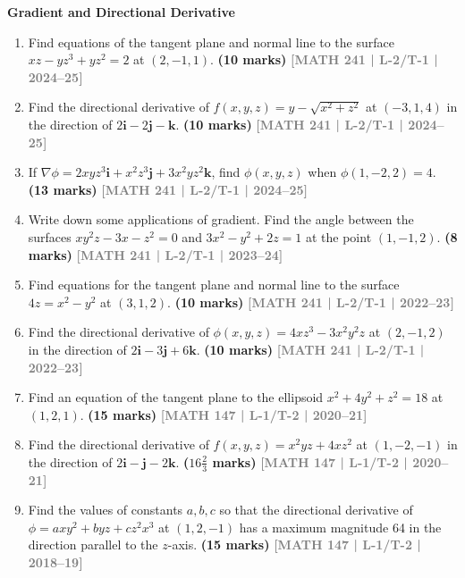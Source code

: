 \documentclass[12pt,a4paper]{article}
\newcommand{\yr}[1]{\hfill\textcolor{gray}{\small\textbf{[#1]}}}
\newcommand{\mk}[1]{\textcolor{orange!70!black}{\small\textbf{(#1 marks)}}}
\newcommand{\subtopic}[2]{%
  \vspace{10pt}
  \noindent\begin{tcolorbox}[colback=#1!8,colframe=#1,boxrule=0.6pt,arc=4pt,
    left=6pt,right=6pt,top=4pt,bottom=4pt]
    \small\bfseries\textcolor{#1}{#2}
  \end{tcolorbox}
  \vspace{2pt}
}
\begin{document}
\subtopic{cD}{Gradient and Directional Derivative}
\label{sub:s4-gradient}

\begin{enumerate}\item Find equations of the tangent plane and normal line to the surface $xz-yz^{3}+yz^{2}=2$ at $(2,-1,1)$.
\mk{10} \yr{MATH 241 | L-2/T-1 | 2024--25}

\item Find the directional derivative of $f(x,y,z)=y-\sqrt{x^{2}+z^{2}}$ at $(-3,1,4)$ in the direction of $2\mathbf{i}-2\mathbf{j}-\mathbf{k}$.
\mk{10} \yr{MATH 241 | L-2/T-1 | 2024--25}

\item If $\nabla\phi=2xyz^{3}\mathbf{i}+x^{2}z^{3}\mathbf{j}+3x^{2}yz^{2}\mathbf{k}$, find $\phi(x,y,z)$ when $\phi(1,-2,2)=4$.
\mk{13} \yr{MATH 241 | L-2/T-1 | 2024--25}

\item Write down some applications of gradient. Find the angle between the surfaces $xy^{2}z-3x-z^{2}=0$ and $3x^{2}-y^{2}+2z=1$ at the point $(1,-1,2)$.
\mk{8} \yr{MATH 241 | L-2/T-1 | 2023--24}

\item Find equations for the tangent plane and normal line to the surface $4z=x^{2}-y^{2}$ at $(3,1,2)$.
\mk{10} \yr{MATH 241 | L-2/T-1 | 2022--23}

\item Find the directional derivative of $\phi(x,y,z)=4xz^{3}-3x^{2}y^{2}z$ at $(2,-1,2)$ in the direction of $2\mathbf{i}-3\mathbf{j}+6\mathbf{k}$.
\mk{10} \yr{MATH 241 | L-2/T-1 | 2022--23}

\item Find an equation of the tangent plane to the ellipsoid $x^{2}+4y^{2}+z^{2}=18$ at $(1,2,1)$.
\mk{15} \yr{MATH 147 | L-1/T-2 | 2020--21}

\item Find the directional derivative of $f(x,y,z)=x^{2}yz+4xz^{2}$ at $(1,-2,-1)$ in the direction of $2\mathbf{i}-\mathbf{j}-2\mathbf{k}$.
\mk{$16\tfrac{2}{3}$} \yr{MATH 147 | L-1/T-2 | 2020--21}

\item Find the values of constants $a,b,c$ so that the directional derivative of $\phi=axy^{2}+byz+cz^{2}x^{3}$ at $(1,2,-1)$ has a maximum magnitude 64 in the direction parallel to the $z$-axis.
\mk{15} \yr{MATH 147 | L-1/T-2 | 2018--19}


\end{enumerate}
\end{document}
